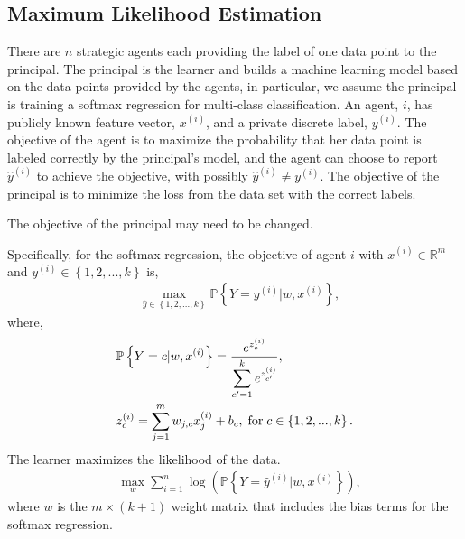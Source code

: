 \documentclass{article}
\begin{document}
\subsection{Maximum Likelihood Estimation}
There are $n $ strategic agents each providing the label of one data point to the principal. The principal is the learner and builds a machine learning model based on the data points provided by the agents, in particular, we assume the principal is training a softmax regression for multi-class classification. An agent, $i $, has publicly known feature vector, $x^{\left(i\right)}$, and a private discrete label, $y^{\left(i\right)}$. The objective of the agent is to maximize the probability that her data point is labeled correctly by the principal's model, and the agent can choose to report $\hat{y} ^{\left(i\right)}$ to achieve the objective, with possibly $\hat{y} ^{\left(i\right)} \neq  y^{\left(i\right)}$. The objective of the principal is to minimize the loss from the data set with the correct labels.
\newline \newline
\begin{tcolorbox}[colback = white]
The objective of the principal may need to be changed.
\end{tcolorbox}
Specifically, for the softmax regression, the objective of agent $i $ with $x^{\left(i\right)} \in \mathbb{R}^{m}$ and $y^{\left(i\right)} \in \left\{1, 2, ..., k \right\}$ is,
\begin{align*}
&  \displaystyle\max_{\hat{y} \in \left\{1, 2, ..., k \right\}} \mathbb{P}\left\{Y = y^{\left(i\right)} | w, x^{\left(i\right)}\right\},
\end{align*}
where,
\begin{align*}
&  \mathbb{P}\left\{Y = c | w, x^{\left(i\right)}\right\} = \dfrac{e^{z_{c}^{\left(i\right)}}}{\displaystyle\sum_{c'=1}^{k} e^{z_{c'}^{\left(i\right)}}},
\\ &  z_{c}^{\left(i\right)} = \displaystyle\sum_{j=1}^{m} w_{j,c} x_{j}^{\left(i\right)} + b_{c} , \text{\;for\;} c \in \left\{1, 2, ..., k\right\}.
\end{align*}
The learner maximizes the likelihood of the data.
\begin{align*}
&\displaystyle\max_{w} \displaystyle\sum_{i=1}^{n} \log\left(\mathbb{P}\left\{Y = \hat{y} ^{\left(i\right)} | w, x^{\left(i\right)}\right\}\right),
\end{align*}
where $w $ is the $m  \times \left(k  + 1\right)$ weight matrix that includes the bias terms for the softmax regression.
\end{document}

